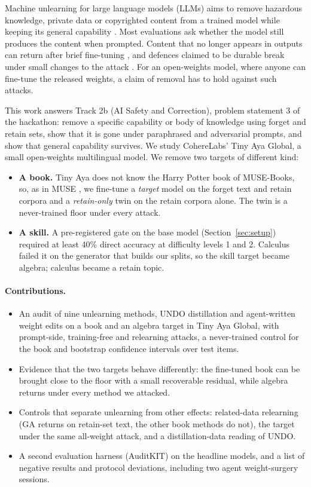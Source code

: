 \documentclass[10pt,twocolumn,letterpaper]{article}
\begin{document}
Machine unlearning for large language models (LLMs) aims to remove hazardous knowledge, private data or copyrighted
content from a trained model while keeping its general capability \cite{shi2025muse,li2024wmdp}. Most evaluations ask
whether the model still produces the content when prompted. Content that no longer appears in outputs can return after
brief fine-tuning \cite{hu2025jogging,lucki2024adversarial,doshi2024does}, and defences claimed to be durable break under
small changes to the attack \cite{qi2025durability}. For an open-weights model, where anyone can fine-tune the released
weights, a claim of removal has to hold against such attacks.

This work answers Track 2b (AI Safety and Correction), problem statement 3 of the hackathon: remove a specific capability
or body of knowledge using forget and retain sets, show that it is gone under paraphrased and adversarial prompts, and show
that general capability survives. We study CohereLabs' Tiny Aya Global, a small open-weights multilingual model. We remove two targets of different kind:
\begin{itemize}
\item \textbf{A book.} Tiny Aya does not know the Harry Potter book of MUSE-Books, so, as in MUSE \cite{shi2025muse}, we
fine-tune a \emph{target} model on the forget text and retain corpora and a \emph{retain-only} twin on the retain corpora
alone. The twin is a never-trained floor under every attack.
\item \textbf{A skill.} A pre-registered gate on the base model (Section~\ref{sec:setup}) required at least 40\% direct
accuracy at difficulty levels 1 and 2. Calculus failed it on the generator that builds our splits, so the skill target
became algebra; calculus became a retain topic.
\end{itemize}

\paragraph{Contributions.}
\begin{itemize}
\item An audit of nine unlearning methods, UNDO distillation and agent-written weight edits on a book and an algebra target
in Tiny Aya Global, with prompt-side, training-free and relearning attacks, a never-trained control for the book and
bootstrap confidence intervals over test items.
\item Evidence that the two targets behave differently: the fine-tuned book can be brought close to the floor with a small
recoverable residual, while algebra returns under every method we attacked.
\item Controls that separate unlearning from other effects: related-data relearning (GA returns on retain-set text, the
other book methods do not), the target under the same all-weight attack, and a distillation-data reading of UNDO.
\item A second evaluation harness (AuditKIT) on the headline models, and a list of negative results and protocol
deviations, including two agent weight-surgery sessions.
\end{itemize}
\end{document}
